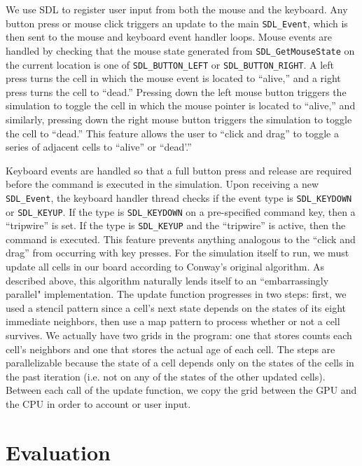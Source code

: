 \documentclass[onecolumn,12pt]{IEEEtran}
\begin{document}
We use SDL to register user input from both the mouse and the keyboard. Any
button press or mouse click triggers an update to the main \texttt{SDL\_Event},
which is then sent to the mouse and keyboard event handler loops. Mouse events
are handled by checking that the mouse state generated from
\texttt{SDL\_GetMouseState} on the current location is one of
\texttt{SDL\_BUTTON\_LEFT} or \texttt{SDL\_BUTTON\_RIGHT}. A left press turns
the cell in which the mouse event is located to ``alive,'' and a right press
turns the cell to ``dead.'' Pressing down the left mouse button triggers the
simulation to toggle the cell in which the mouse pointer is located to
``alive,'' and similarly, pressing down the right mouse button triggers the
simulation to toggle the cell to ``dead.'' This feature allows the user to
``click and drag'' to toggle a series of adjacent cells to ``alive'' or
``dead'.''

Keyboard events are handled so that a full button press and release are
required before the command is executed in the simulation. Upon receiving a new
\texttt{SDL\_Event}, the keyboard handler thread checks if the event type is
\texttt{SDL\_KEYDOWN} or \texttt{SDL\_KEYUP}. If the type is
\texttt{SDL\_KEYDOWN} on a pre-specified command key, then a ``tripwire'' is
set. If the type is \texttt{SDL\_KEYUP} and the ``tripwire'' is active, then
the command is executed. This feature prevents anything analogous to the
``click and drag'' from occurring with key presses.  For the simulation itself to run, we must update all cells in our board
according to Conway's original algorithm. As described above, this algorithm
naturally lends itself to an ``embarrassingly parallel" implementation. The
update function progresses in two steps: first, we used a stencil pattern since
a cell's next state depends on the states of its eight immediate neighbors,
then use a map pattern to process whether or not a cell survives. We actually
have two grids in the program: one that stores counts each cell's neighbors and
one that stores the actual age of each cell. The steps are parallelizable
because the state of a cell depends only on the states of the cells in the past
iteration (i.e. not on any of the states of the other updated cells). Between
each call of the update function, we copy the grid between the GPU and the CPU
in order to account or user input.

\section{Evaluation}
\end{document}
